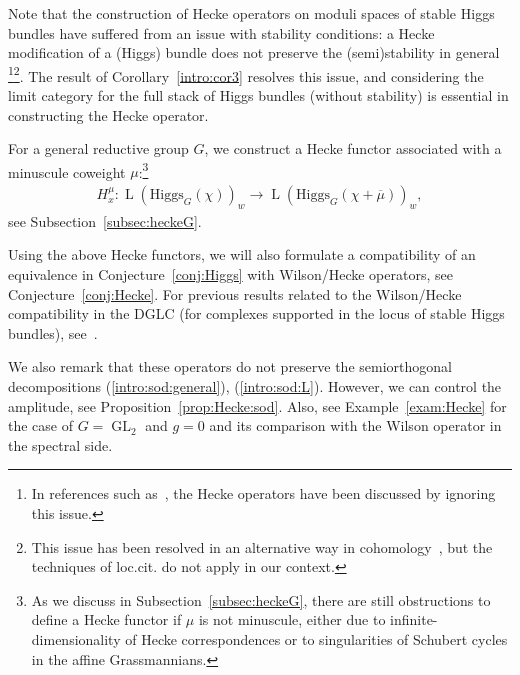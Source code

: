 \documentclass [11pt,oneside,a4paper,mathscr]{amsart}
\newtheorem{prop}[thm]{Proposition}
\theoremstyle{definition}
\renewcommand{\geq}{\geqslant}
\newcommand{\LL}{\operatorname{L}}
\newcommand{\GL}{\operatorname{GL}}
\newcommand{\Hig}{\mathrm{Higgs}}
\begin{document}
Note that the construction of Hecke operators on moduli spaces of stable Higgs bundles 
have suffered from an issue with stability conditions: a Hecke 
modification of a (Higgs) bundle does not preserve the (semi)stability in general
\footnote{In references such as~\cite[Section~3.4]{HauICM}, the Hecke operators have been discussed by ignoring 
this issue.}\footnote{This issue has been resolved in an alternative way in cohomology~\cite{HMMS, MMSV}, but the techniques of loc.cit. do not apply in our context.}.
The result of Corollary~\ref{intro:cor3} resolves this issue, and 
considering the limit category for the full stack of 
Higgs bundles (without stability) is essential in constructing the Hecke operator. 

For a general reductive group $G$, we construct a Hecke functor associated with a minuscule coweight $\mu$:\footnote{As we discuss in Subsection~\ref{subsec:heckeG}, there are still obstructions to define a Hecke functor if $\mu$ is not minuscule, either due to infinite-dimensionality of Hecke correspondences or to singularities of Schubert cycles in the affine Grassmannians.}
\begin{align*}
    H_x^{\mu} \colon \LL(\Hig_G(\chi))_w \to \LL(\Hig_G(\chi+\overline{\mu}))_{w},
\end{align*}
see Subsection~\ref{subsec:heckeG}. 

Using the above Hecke functors, we will also formulate a compatibility of an equivalence 
in Conjecture~\ref{conj:Higgs} with Wilson/Hecke operators, see Conjecture~\ref{conj:Hecke}. For previous results related to the Wilson/Hecke compatibility in the DGLC (for complexes supported in the locus of stable Higgs bundles), see~\cite{HauICM, HauHit, HaMePe, DFang}. 

We also remark that these operators do not preserve the semiorthogonal decompositions (\ref{intro:sod:general}), (\ref{intro:sod:L}). However, we can control the amplitude,
see Proposition~\ref{prop:Hecke:sod}. 
Also, see Example~\ref{exam:Hecke} for the case of $G=\GL_2$ and $g=0$ and its comparison 
with the Wilson operator in the spectral side. 
\end{document}

